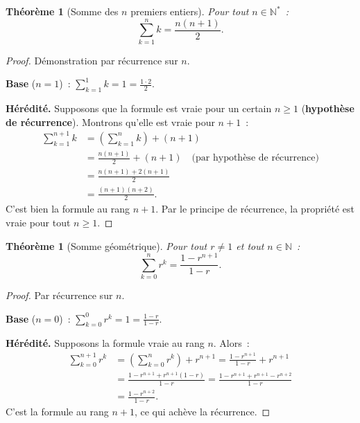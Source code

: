 \documentclass[12pt,a4paper,openany]{book}
\theoremstyle{definition}
\theoremstyle{plain}
\newtheorem{theoreme}[definition]{Théorème}
\theoremstyle{remark}
\newcommand{\N}{\mathbb{N}}
\begin{document}
\begin{theoreme}[Somme des $n$ premiers entiers]\label{thm:somme-n}
  Pour tout $n \in \N^*$~:
  \[
    \sum_{k=1}^{n} k = \frac{n(n+1)}{2}.
  \]
\end{theoreme}

\begin{proof}
  D\'emonstration par r\'ecurrence sur $n$.

  \textbf{Base} ($n = 1$)~: $\displaystyle\sum_{k=1}^{1} k = 1 = \frac{1 \cdot 2}{2}$. \checkmark

  \textbf{H\'er\'edit\'e.} Supposons que la formule est vraie pour un certain $n \geq 1$ (\textbf{hypoth\`ese de r\'ecurrence}). Montrons qu'elle est vraie pour $n+1$~:
  \begin{align*}
    \sum_{k=1}^{n+1} k &= \left(\sum_{k=1}^{n} k\right) + (n+1) \\
    &= \frac{n(n+1)}{2} + (n+1) \quad\text{(par hypoth\`ese de r\'ecurrence)} \\
    &= \frac{n(n+1) + 2(n+1)}{2} \\
    &= \frac{(n+1)(n+2)}{2}.
  \end{align*}
  C'est bien la formule au rang $n+1$. Par le principe de r\'ecurrence, la propri\'et\'e est vraie pour tout $n \geq 1$.
\end{proof}

\begin{theoreme}[Somme g\'eom\'etrique]\label{thm:somme-geo}
  Pour tout $r \neq 1$ et tout $n \in \N$~:
  \[
    \sum_{k=0}^{n} r^k = \frac{1 - r^{n+1}}{1 - r}.
  \]
\end{theoreme}

\begin{proof}
  Par r\'ecurrence sur $n$.

  \textbf{Base} ($n = 0$)~: $\displaystyle\sum_{k=0}^{0} r^k = 1 = \frac{1 - r}{1 - r}$. \checkmark

  \textbf{H\'er\'edit\'e.} Supposons la formule vraie au rang $n$. Alors~:
  \begin{align*}
    \sum_{k=0}^{n+1} r^k &= \left(\sum_{k=0}^{n} r^k\right) + r^{n+1} = \frac{1 - r^{n+1}}{1 - r} + r^{n+1} \\
    &= \frac{1 - r^{n+1} + r^{n+1}(1 - r)}{1 - r} = \frac{1 - r^{n+1} + r^{n+1} - r^{n+2}}{1 - r} \\
    &= \frac{1 - r^{n+2}}{1 - r}.
  \end{align*}
  C'est la formule au rang $n+1$, ce qui ach\`eve la r\'ecurrence.
\end{proof}
\end{document}
